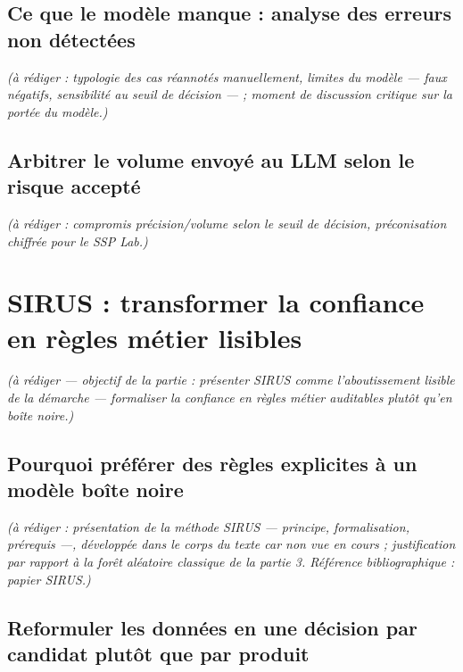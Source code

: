 \documentclass[
]{rapportCS}
\begin{document}
\subsection{Ce que le modèle manque : analyse des erreurs non
détectées}\label{ce-que-le-moduxe8le-manque-analyse-des-erreurs-non-duxe9tectuxe9es}

\emph{(à rédiger : typologie des cas réannotés manuellement, limites du
modèle --- faux négatifs, sensibilité au seuil de décision --- ; moment
de discussion critique sur la portée du modèle.)}

\subsection{Arbitrer le volume envoyé au LLM selon le risque
accepté}\label{arbitrer-le-volume-envoyuxe9-au-llm-selon-le-risque-acceptuxe9}

\emph{(à rédiger : compromis précision/volume selon le seuil de
décision, préconisation chiffrée pour le SSP Lab.)}

\newpage

\section{SIRUS : transformer la confiance en règles métier
lisibles}\label{sirus-transformer-la-confiance-en-ruxe8gles-muxe9tier-lisibles}

\emph{(à rédiger --- objectif de la partie : présenter SIRUS comme
l'aboutissement lisible de la démarche --- formaliser la confiance en
règles métier auditables plutôt qu'en boîte noire.)}

\subsection{Pourquoi préférer des règles explicites à un modèle boîte
noire}\label{pourquoi-pruxe9fuxe9rer-des-ruxe8gles-explicites-uxe0-un-moduxe8le-bouxeete-noire}

\emph{(à rédiger : présentation de la méthode SIRUS --- principe,
formalisation, prérequis ---, développée dans le corps du texte car non
vue en cours ; justification par rapport à la forêt aléatoire classique
de la partie 3. Référence bibliographique : papier SIRUS.)}

\subsection{Reformuler les données en une décision par candidat plutôt
que par
produit}\label{reformuler-les-donnuxe9es-en-une-duxe9cision-par-candidat-plutuxf4t-que-par-produit}
\end{document}
